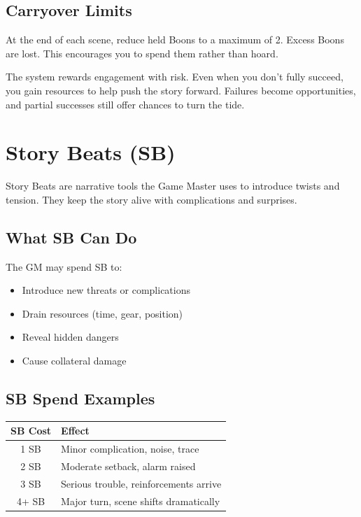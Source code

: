 \documentclass[11pt,twoside,openany]{book}
\begin{document}
\subsection*{Carryover Limits}

At the end of each scene, reduce held Boons to a maximum of 2. Excess Boons are lost. This encourages you to spend them rather than hoard.

\begin{tcolorbox}[colback=gray!5!white, colframe=gray!75!black, title=Why This Matters, fonttitle=\bfseries,breakable]
The system rewards engagement with risk. Even when you don't fully succeed, you gain resources to help push the story forward. Failures become opportunities, and partial successes still offer chances to turn the tide.
\end{tcolorbox}

\section*{Story Beats (SB)} 

Story Beats are narrative tools the Game Master uses to introduce twists and tension. They keep the story alive with complications and surprises.

\subsection*{What SB Can Do}

The GM may spend SB to:
\begin{itemize}
\item Introduce new threats or complications
\item Drain resources (time, gear, position)
\item Reveal hidden dangers
\item Cause collateral damage
\end{itemize}

\subsection*{SB Spend Examples}

\begin{center}
\begin{tabular}{|c|l|}
\hline
\textbf{SB Cost} & \textbf{Effect} \\
\hline
1 SB & Minor complication, noise, trace \\
2 SB & Moderate setback, alarm raised \\
3 SB & Serious trouble, reinforcements arrive \\
4+ SB & Major turn, scene shifts dramatically \\
\hline
\end{tabular}
\end{center}
\end{document}
